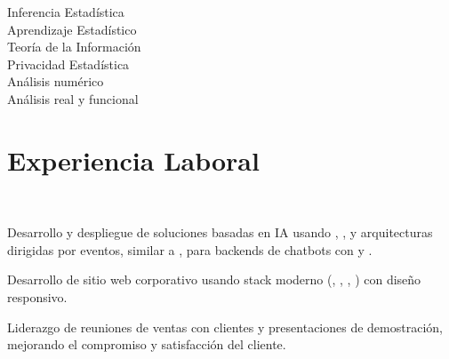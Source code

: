 \documentclass[]{tex/deedy-resume-openfont}
\begin{document}
\begin{minipage}[t]{0.32\textwidth}
\sectionsep

Inferencia Estadística\\
Aprendizaje Estadístico\\
Teoría de la Información\\
Privacidad Estadística\\
Análisis numérico \\
Análisis real y funcional\\

%
%

\end{minipage} 
\hfill
\begin{minipage}[t]{0.66\textwidth} 


\section{Experiencia Laboral}

\\
\vspace{\topsep}
\begin{tightemize}
    \item Desarrollo y despliegue de soluciones basadas en IA usando , , y arquitecturas dirigidas por eventos, similar a , para backends de chatbots con  y .
    \item Desarrollo de sitio web corporativo usando stack moderno (, , , ) con diseño responsivo.
    \item Liderazgo de reuniones de ventas con clientes y presentaciones de demostración, mejorando el compromiso y satisfacción del cliente.
\end{tightemize}
\sectionsep


\end{minipage}
\end{document}
